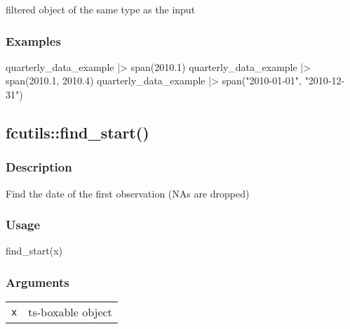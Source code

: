\documentclass[
  letterpaper,
  DIV=11,
  numbers=noendperiod]{scrreport}
\newenvironment{Shaded}{\begin{snugshade}}{\end{snugshade}}
\newcommand{\FloatTok}[1]{\textcolor[rgb]{0.68,0.00,0.00}{#1}}
\newcommand{\FunctionTok}[1]{\textcolor[rgb]{0.28,0.35,0.67}{#1}}
\newcommand{\NormalTok}[1]{\textcolor[rgb]{0.00,0.23,0.31}{#1}}
\newcommand{\SpecialCharTok}[1]{\textcolor[rgb]{0.37,0.37,0.37}{#1}}
\newcommand{\StringTok}[1]{\textcolor[rgb]{0.13,0.47,0.30}{#1}}
\begin{document}
filtered object of the same type as the input

\subsubsection{Examples}\label{examples-13}

\begin{Shaded}
\begin{Highlighting}[]
\NormalTok{quarterly\_data\_example }\SpecialCharTok{|\textgreater{}}
  \FunctionTok{span}\NormalTok{(}\FloatTok{2010.1}\NormalTok{)}
\NormalTok{quarterly\_data\_example }\SpecialCharTok{|\textgreater{}}
  \FunctionTok{span}\NormalTok{(}\FloatTok{2010.1}\NormalTok{, }\FloatTok{2010.4}\NormalTok{)}
\NormalTok{quarterly\_data\_example }\SpecialCharTok{|\textgreater{}}
  \FunctionTok{span}\NormalTok{(}\StringTok{"2010{-}01{-}01"}\NormalTok{, }\StringTok{"2010{-}12{-}31"}\NormalTok{)}
\end{Highlighting}
\end{Shaded}

\subsection{fcutils::find\_start()}\label{fcutilsfind_start}

\subsubsection{Description}\label{description-14}

Find the date of the first observation (NAs are dropped)

\subsubsection{Usage}\label{usage-14}

\begin{Shaded}
\begin{Highlighting}[]
\FunctionTok{find\_start}\NormalTok{(x)}
\end{Highlighting}
\end{Shaded}

\subsubsection{Arguments}\label{arguments-14}

\begin{longtable}[]{@{}ll@{}}
\toprule\noalign{}
\endhead
\bottomrule\noalign{}
\endlastfoot
\texttt{x} & ts-boxable object \\
\end{longtable}
\end{document}
